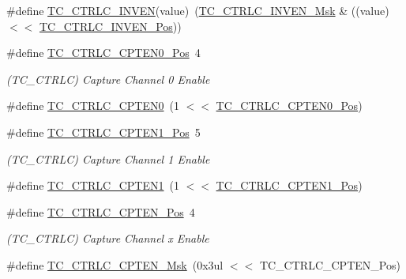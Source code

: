\begin{DoxyCompactItemize}
\item 
\#define \mbox{\hyperlink{group___s_a_m_d21___t_c_gabcaa416dc792b45f9ea315455d3ab4c0}{T\+C\+\_\+\+C\+T\+R\+L\+C\+\_\+\+I\+N\+V\+EN}}(value)~(\mbox{\hyperlink{group___s_a_m_d21___t_c_gadae057c41c4a6eaa82501c5e285bb4a8}{T\+C\+\_\+\+C\+T\+R\+L\+C\+\_\+\+I\+N\+V\+E\+N\+\_\+\+Msk}} \& ((value) $<$$<$ \mbox{\hyperlink{group___s_a_m_d21___t_c_ga2d922bac55e26a8749861fe5aaecf329}{T\+C\+\_\+\+C\+T\+R\+L\+C\+\_\+\+I\+N\+V\+E\+N\+\_\+\+Pos}}))
\item 
\#define \mbox{\hyperlink{group___s_a_m_d21___t_c_gadf9eeb380b731b523d4ad46432a72c6e}{T\+C\+\_\+\+C\+T\+R\+L\+C\+\_\+\+C\+P\+T\+E\+N0\+\_\+\+Pos}}~4
\begin{DoxyCompactList}\small\item\em (T\+C\+\_\+\+C\+T\+R\+LC) Capture Channel 0 Enable \end{DoxyCompactList}\item 
\#define \mbox{\hyperlink{group___s_a_m_d21___t_c_ga04934c7e74ac63da3b4e56a8fb8e095b}{T\+C\+\_\+\+C\+T\+R\+L\+C\+\_\+\+C\+P\+T\+E\+N0}}~(1 $<$$<$ \mbox{\hyperlink{group___s_a_m_d21___t_c_gadf9eeb380b731b523d4ad46432a72c6e}{T\+C\+\_\+\+C\+T\+R\+L\+C\+\_\+\+C\+P\+T\+E\+N0\+\_\+\+Pos}})
\item 
\#define \mbox{\hyperlink{group___s_a_m_d21___t_c_ga120fbae3269e65376251aa53f3d7909a}{T\+C\+\_\+\+C\+T\+R\+L\+C\+\_\+\+C\+P\+T\+E\+N1\+\_\+\+Pos}}~5
\begin{DoxyCompactList}\small\item\em (T\+C\+\_\+\+C\+T\+R\+LC) Capture Channel 1 Enable \end{DoxyCompactList}\item 
\#define \mbox{\hyperlink{group___s_a_m_d21___t_c_gacf85de370ab0759f8c51efa8f8c50270}{T\+C\+\_\+\+C\+T\+R\+L\+C\+\_\+\+C\+P\+T\+E\+N1}}~(1 $<$$<$ \mbox{\hyperlink{group___s_a_m_d21___t_c_ga120fbae3269e65376251aa53f3d7909a}{T\+C\+\_\+\+C\+T\+R\+L\+C\+\_\+\+C\+P\+T\+E\+N1\+\_\+\+Pos}})
\item 
\#define \mbox{\hyperlink{group___s_a_m_d21___t_c_gaef3ed0d7721db6fb8ecf185a7f0a058e}{T\+C\+\_\+\+C\+T\+R\+L\+C\+\_\+\+C\+P\+T\+E\+N\+\_\+\+Pos}}~4
\begin{DoxyCompactList}\small\item\em (T\+C\+\_\+\+C\+T\+R\+LC) Capture Channel x Enable \end{DoxyCompactList}\item 
\#define \mbox{\hyperlink{group___s_a_m_d21___t_c_ga15f110683a1389fa83f4e4183bc05c91}{T\+C\+\_\+\+C\+T\+R\+L\+C\+\_\+\+C\+P\+T\+E\+N\+\_\+\+Msk}}~(0x3ul $<$$<$ T\+C\+\_\+\+C\+T\+R\+L\+C\+\_\+\+C\+P\+T\+E\+N\+\_\+\+Pos)

\end{DoxyCompactItemize}
